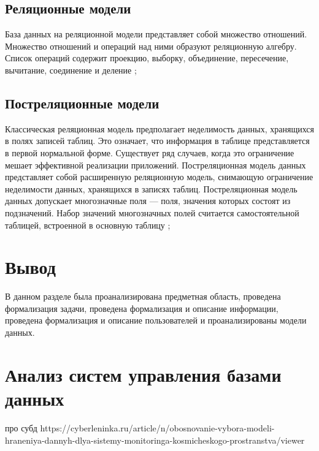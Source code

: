 \subsection{Реляционные модели}
База данных на реляционной модели представляет собой множество отношений.
Множество отношений и операций над ними образуют реляционную алгебру.
Список операций содержит проекцию, выборку, объединение, пересечение, вычитание, соединение и деление \cite{dbms};

\subsection{Постреляционные модели}
Классическая реляционная модель предполагает неделимость данных, хранящихся в полях записей таблиц.
Это означает, что информация в таблице представляется в первой нормальной форме.
Существует ряд случаев, когда это ограничение мешает эффективной реализации приложений.
Постреляционная модель данных представляет собой расширенную реляционную модель, снимающую ограничение неделимости данных, хранящихся в записях таблиц.
Постреляционная модель данных допускает многозначные поля --- поля, значения которых состоят из подзначений.
Набор значений многозначных полей считается самостоятельной таблицей, встроенной в основную таблицу \cite{voroneg};
 
\section*{Вывод}
В данном разделе была проанализирована предметная область, проведена формализация задачи, проведена формализация и описание информации, проведена формализация и описание пользователей и проанализированы модели данных. 

\section{Анализ систем управления базами данных}
 
 про субд https://cyberleninka.ru/article/n/obosnovanie-vybora-modeli-hraneniya-dannyh-dlya-sistemy-monitoringa-kosmicheskogo-prostranstva/viewer